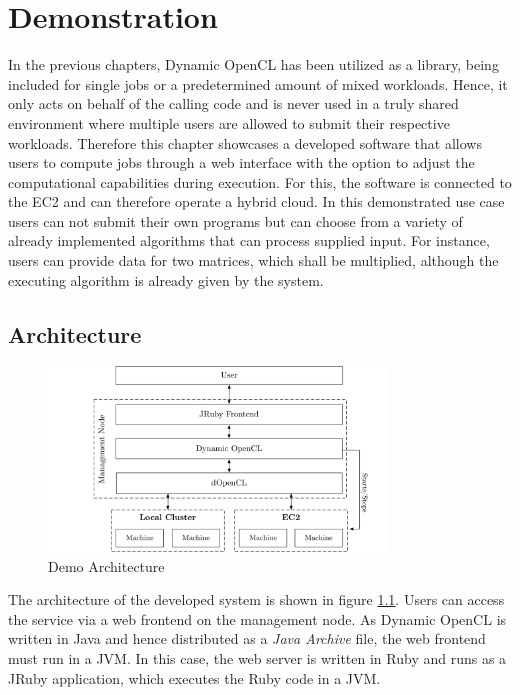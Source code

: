\chapter{Demonstration}
\label{demonstration}
In the previous chapters, Dynamic OpenCL has been utilized as a library, being included for single jobs or a predetermined amount of mixed workloads. Hence, it only acts on behalf of the calling code and is never used in a truly shared environment where multiple users are allowed to submit their respective workloads. Therefore this chapter showcases a developed software that allows users to compute jobs through a web interface with the option to adjust the computational capabilities during execution. For this, the software is connected to the EC2 and can therefore operate a hybrid cloud. In this demonstrated use case users can not submit their own programs but can choose from a variety of already implemented algorithms that can process supplied input. For instance, users can provide data for two matrices, which shall be multiplied, although the executing algorithm is already given by the system.

\section{Architecture}

\begin{figure}[!htb]
	\includegraphics[width=0.8\textwidth]{drawings/demo_architecture.pdf}
	\centering
	\caption{Demo Architecture}
	\label{img:demo_architecture}
\end{figure}
The architecture of the developed system is shown in figure \ref{img:demo_architecture}. Users can access the service via a web frontend on the management node. As Dynamic OpenCL is written in Java and hence distributed as a \textit{Java Archive} file, the web frontend must run in a JVM. In this case, the web server is written in Ruby and runs as a JRuby application, which executes the Ruby code in a JVM.

